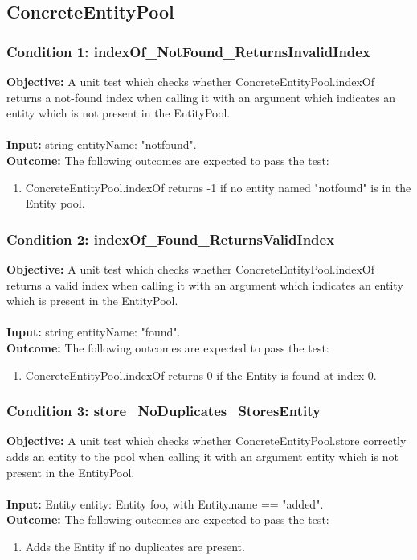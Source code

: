 \documentclass[a4paper,12pt]{article}
\begin{document}
	\subsection{ConcreteEntityPool}
		\subsubsection{Condition 1: indexOf\_NotFound\_ReturnsInvalidIndex}
			\textbf{Objective:} A unit test which checks whether ConcreteEntityPool.indexOf returns a not-found index when calling it with an argument which indicates an entity which is not present in the EntityPool.\\\\
			\textbf{Input:} string entityName: "notfound".\\
			\textbf{Outcome:} The following outcomes are expected to pass the test:
				\begin{enumerate}
					\item ConcreteEntityPool.indexOf returns -1 if no entity named "notfound" is in the Entity pool.
				\end{enumerate}
		\subsubsection{Condition 2: indexOf\_Found\_ReturnsValidIndex}
			\textbf{Objective:} A unit test which checks whether ConcreteEntityPool.indexOf returns a valid index when calling it with an argument which indicates an entity which is present in the EntityPool.\\\\
			\textbf{Input:} string entityName: "found".\\
			\textbf{Outcome:} The following outcomes are expected to pass the test:
				\begin{enumerate}
					\item ConcreteEntityPool.indexOf returns 0 if the Entity is found at index 0.
				\end{enumerate}
		\subsubsection{Condition 3: store\_NoDuplicates\_StoresEntity}
			\textbf{Objective:} A unit test which checks whether ConcreteEntityPool.store correctly adds an entity to the pool when calling it with an argument entity which is not present in the EntityPool.\\\\
			\textbf{Input:} Entity entity: Entity foo, with Entity.name == "added".\\
			\textbf{Outcome:} The following outcomes are expected to pass the test:
				\begin{enumerate}
					\item Adds the Entity if no duplicates are present.
				\end{enumerate}
\end{document}
